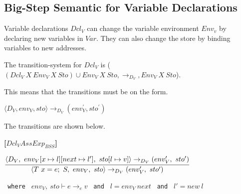 {%


\subsection{Big-Step Semantic for Variable Declarations}
Variable declarations $Dcl_V$ can change the variable environment $Env_v$ by declaring new variables in $Var$.
They can also change the store by binding variables to new addresses.

The transition-system for $Dcl_V$ is ($(Dcl_V\ X\ Env_V\ X\ Sto) \cup Env_V\ X\ Sto, \rightarrow_{D_{V}}, Env_V\ X\ Sto$).

This means that the transitions must be on the form.

\begin{center}
	$\langle D_V,env_V,sto \rangle \rightarrow_{D_V} (env_V^{'} , sto^{'})$
\end{center}

The transitions are shown below.

\textbf{[$Dcl_VAssExp_{BSS}$]}\\
\begin{center}
	\begin{math}
	\cfrac
		{\langle D_V,\ env_V[x \mapsto l][next \mapsto l'],\ sto[l \mapsto v] \rangle \rightarrow_{D_V} (env_V',\ sto')}
		{\langle T\ x = e;\ S,\ env_V,\ sto \rangle \rightarrow_{D_V} (env_V',\ sto')}
	\end{math}
	
	\texttt{ where } $env_V,\ sto \vdash e \rightarrow_e v$
	\texttt{ and } $l = env_V\ next$
	\texttt{ and } $l' = new\ l$
\end{center}

}
